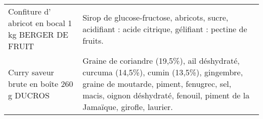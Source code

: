 \begin{longtable}{p{5cm}p{10cm}}
                                                       Confiture d' abricot en bocal 1 kg BERGER DE FRUIT &                                                                                                                                                                                                                                                                                                                                                                                                                                                                                                                                                                                                                                                                                                                                                                                                                                                                                                                                  Sirop de glucose-fructose, abricots, sucre, acidifiant : acide citrique, gélifiant : pectine de fruits. \\
                                                                 Curry saveur brute en boîte 260 g DUCROS &                                                                                                                                                                                                                                                                                                                                                                                                                                                                                                                                                                                                                                                                                                                                                                                                                           Graine de coriandre (19,5\%), ail déshydraté, curcuma (14,5\%), cumin (13,5\%), gingembre, graine de moutarde, piment, fenugrec, sel, macis, oignon déshydraté, fenouil, piment de la Jamaïque, girofle, laurier. \\

\end{longtable}
